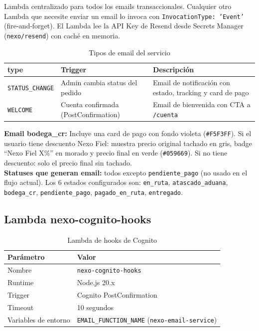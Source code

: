\documentclass[12pt,a4paper]{article}
\begin{document}
Lambda centralizado para todos los emails transaccionales. Cualquier otro Lambda
que necesite enviar un email lo invoca con \texttt{InvocationType: 'Event'}
(fire-and-forget). El Lambda lee la API Key de Resend desde Secrets Manager
(\texttt{nexo/resend}) con caché en memoria.

\begin{table}[H]
\centering
\begin{tabular}{@{}lll@{}}
\toprule
\textbf{type} & \textbf{Trigger} & \textbf{Descripción} \\
\midrule
\texttt{STATUS\_CHANGE} & Admin cambia status del pedido & Email de notificación con estado, tracking y card de pago \\
\texttt{WELCOME} & Cuenta confirmada (PostConfirmation) & Email de bienvenida con CTA a \texttt{/cuenta} \\
\bottomrule
\end{tabular}
\caption{Tipos de email del servicio}
\end{table}

\begin{nexobox}
\textbf{Email bodega\_cr:} Incluye una card de pago con fondo violeta (\texttt{\#F5F3FF}).
Si el usuario tiene descuento Nexo Fiel: muestra precio original tachado en gris,
badge ``Nexo Fiel X\%'' en morado y precio final en verde (\texttt{\#059669}).
Si no tiene descuento: solo el precio final sin tachado.\\[4pt]
\textbf{Statuses que generan email:} todos excepto \texttt{pendiente\_pago} (no usado
en el flujo actual). Los 6 estados configurados son: \texttt{en\_ruta},
\texttt{atascado\_aduana}, \texttt{bodega\_cr}, \texttt{pendiente\_pago},
\texttt{pagado\_en\_ruta}, \texttt{entregado}.
\end{nexobox}

\subsection{Lambda nexo-cognito-hooks}

\begin{table}[H]
\centering
\begin{tabular}{@{}ll@{}}
\toprule
\textbf{Parámetro} & \textbf{Valor} \\
\midrule
Nombre & \texttt{nexo-cognito-hooks} \\
Runtime & Node.js 20.x \\
Trigger & Cognito PostConfirmation \\
Timeout & 10 segundos \\
Variables de entorno & \texttt{EMAIL\_FUNCTION\_NAME} (\texttt{nexo-email-service}) \\
\bottomrule
\end{tabular}
\caption{Lambda de hooks de Cognito}
\end{table}
\end{document}
